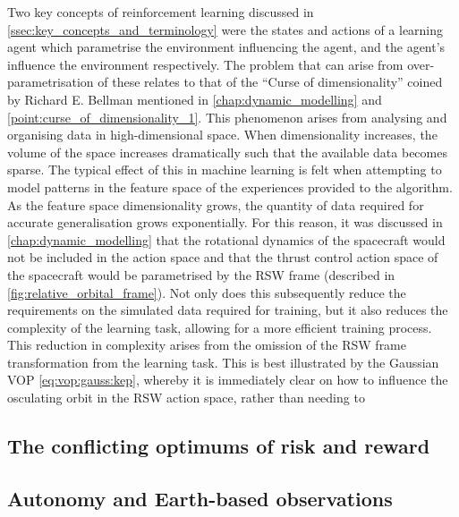 Two key concepts of reinforcement learning discussed in \autoref{ssec:key_concepts_and_terminology} were the states and actions of a learning agent which parametrise the environment influencing the agent, and the agent's influence the environment respectively. The problem that can arise from over-parametrisation of these relates to that of the ``Curse of dimensionality'' coined by Richard E. Bellman mentioned in \autoref{chap:dynamic_modelling} and \autoref{point:curse_of_dimensionality_1}. This phenomenon arises from analysing and organising data in high-dimensional space. When dimensionality increases, the volume of the space increases dramatically such that the available data becomes sparse. The typical effect of this in machine learning is felt when attempting to model patterns in the feature space of the experiences provided to the algorithm. As the feature space dimensionality grows, the quantity of data required for accurate generalisation grows exponentially. For this reason, it was discussed in \autoref{chap:dynamic_modelling} that the rotational dynamics of the spacecraft would not be included in the action space and that the thrust control action space of the spacecraft would be parametrised by the RSW frame (described in \autoref{fig:relative_orbital_frame}). Not only does this subsequently reduce the requirements on the simulated data required for training, but it also reduces the complexity of the learning task, allowing for a more efficient training process. This reduction in complexity arises from the omission of the RSW frame transformation from the learning task. This is best illustrated by the Gaussian \gls{VOP} \autoref{eq:vop:gauss:kep}, whereby it is immediately clear on how to influence the osculating orbit in the RSW action space, rather than needing to

\subsection{The conflicting optimums of risk and reward}\label{ssec:insight:conflicting-optimums}

\subsection{Autonomy and Earth-based observations}\label{ssec:insight:autonomy-earth-based}

